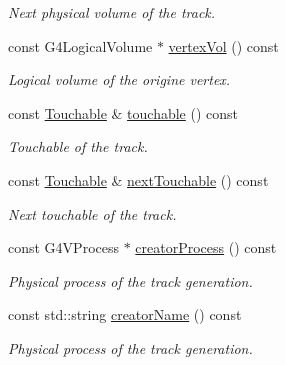 \begin{DoxyCompactItemize}
\begin{DoxyCompactList}\small\item\em Next physical volume of the track. \item\end{DoxyCompactList}\item 
const G4LogicalVolume $\ast$ \hyperlink{class_d_d4hep_1_1_simulation_1_1_geant4_track_handler_af5209e28628bd58a99d0ca28299d94e9}{vertexVol} () const 
\begin{DoxyCompactList}\small\item\em Logical volume of the origine vertex. \item\end{DoxyCompactList}\item 
const \hyperlink{class_d_d4hep_1_1_simulation_1_1_geant4_track_handler_a7db438397a8ccd838ba7bf5fe1b75bdb}{Touchable} \& \hyperlink{class_d_d4hep_1_1_simulation_1_1_geant4_track_handler_a5ed6c27f8de4cbfe76f4213c06bd72b3}{touchable} () const 
\begin{DoxyCompactList}\small\item\em Touchable of the track. \item\end{DoxyCompactList}\item 
const \hyperlink{class_d_d4hep_1_1_simulation_1_1_geant4_track_handler_a7db438397a8ccd838ba7bf5fe1b75bdb}{Touchable} \& \hyperlink{class_d_d4hep_1_1_simulation_1_1_geant4_track_handler_a9d2aba96b778903b66882e922ec24f29}{nextTouchable} () const 
\begin{DoxyCompactList}\small\item\em Next touchable of the track. \item\end{DoxyCompactList}\item 
const G4VProcess $\ast$ \hyperlink{class_d_d4hep_1_1_simulation_1_1_geant4_track_handler_a58d18fef161e0f06bd860e0a67c3db48}{creatorProcess} () const 
\begin{DoxyCompactList}\small\item\em Physical process of the track generation. \item\end{DoxyCompactList}\item 
const std::string \hyperlink{class_d_d4hep_1_1_simulation_1_1_geant4_track_handler_a12603b39059e2c20a5bca9c3389da596}{creatorName} () const 
\begin{DoxyCompactList}\small\item\em Physical process of the track generation. \item\end{DoxyCompactList}\item 

\end{DoxyCompactItemize}
